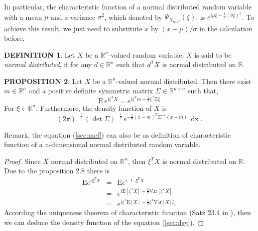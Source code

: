 \documentclass[a4paper, twoside, 11pt]{article}
\theoremstyle{definition}
\newtheorem{definition}{DEFINITION}[section]
\newtheorem{proposition}[definition]{\large PROPOSITION}
\newcommand{\sqbr}[1]{\left[ {#1} \right]}
\begin{document}
In particular, the characteristic function of a normal distributed random variable with a mean $\mu$ and a variance $\sigma^2$, which denoted by $\Psi_{X_{\mu,\sigma^2}}(\xi)$, is $e^{i\mu\xi-\frac{1}{2}(\sigma\xi)^2}$. To achieve this result, we just need to substitute $x$ by $(x-\mu)/\sigma$ in the calculation before. 

\begin{definition}
  Let $X$ be a $\mathbb{R}^{n}$-valued random variable. $X$ is said to be \emph{normal distributed}, if for any $d \in \mathbb{R}^{n}$ such that $d^TX$ is normal distributed on $\mathbb{R}$.
\end{definition}
\begin{proposition}
  Let $X$ be a $\mathbb{R}^{n}$-valued normal distributed. Then there exist $m \in \mathbb{R}^{n}$ and a positive definite symmetric matrix $\Sigma \in \mathbb{R}^{n\times n}$ such that,
  \begin{equation}
	\mathrm{E}\,e^{i\xi^TX} = e^{i\xi^Tm - \frac{1}{2}\xi^T \Sigma \xi}
	\label{sec:mcf}
  \end{equation}
  For $\xi \in \mathbb{R}^{n}$. Furthermore, the density function of $X$ is
\begin{equation}
  (2\pi)^{-\frac{d}{2}}\, (\det\Sigma) ^{-\frac{1}{2}}\,e^{-\frac{1}{2}(x-m)^T\Sigma^{-1}(x-m)}\,\mathop{dx}.
  \label{sec:dsy}
\end{equation}
\end{proposition}

Remark, the equation (\ref{sec:mcf}) can also be as definition of characteristic function of a n-dimensional normal distributed random variable.

\begin{proof}
  Since $X$ normal distributed on $\mathbb{R}^{n}$, then $\xi^T X$ is normal distributed on $\mathbb{R}$. Due to the proposition 2.8 there is
  \begin{eqnarray*}
	\mathrm{E} e^{i\xi^T X} &=& \mathrm{E} e^{i\cdot 1 \cdot \xi^T X}\\
	                        &=& e^{i\mathrm{E}\sqbr{\xi^T X} -\frac{1}{2}\mathrm{Var}\sqbr{\xi^T X}}\\
							&=& e^{i\xi^T\mathrm{E}\sqbr{X} - \frac{1}{2}\xi^T \mathrm{Var}\sqbr{X} \xi}.
	\label{}
  \end{eqnarray*}
  According the uniqueness theorem of characteristic function (Satz 23.4 in \cite{bauer}), then we can deduce the density function of the equation (\ref{sec:dsy}).
\end{proof}
\end{document}
